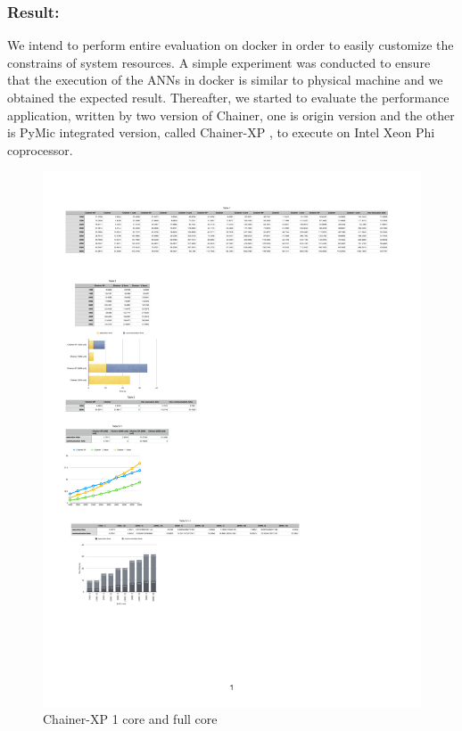 \subsubsection{Result:}
%
We intend to perform entire evaluation on docker in order to easily customize the constrains of system resources. A simple experiment was conducted to ensure that the execution of the ANNs in docker is similar to physical machine and we obtained the expected result. Thereafter, we started to evaluate the performance  application, written by two version of Chainer, one is origin version and the other is PyMic integrated version, called Chainer-XP , to execute on Intel Xeon Phi coprocessor.
\begin{figure}[]
\centering
\includegraphics[scale=0.6]{img/a.pdf}
\caption{Chainer-XP 1 core and full core}
\end{figure}


